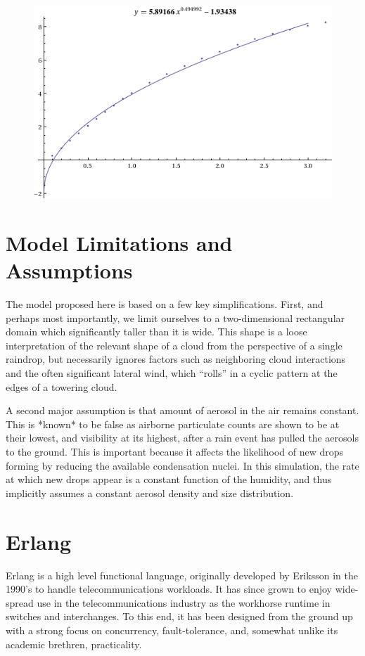 \documentclass[twocolumn,a4paper,10pt]{article}
\begin{document}
\begin{figure}[t]
    \centering
    \includegraphics[width=0.75\linewidth]{terminal_velocity}
    \caption{}
    \label{fig:velocity}
\end{figure}


\section{Model Limitations and Assumptions}

The model proposed here is based on a few key simplifications. First, and
perhaps most importantly, we limit ourselves to a two-dimensional rectangular
domain which significantly taller than it is wide. This shape is a loose
interpretation of the relevant shape of a cloud from the perspective of a single
raindrop, but necessarily ignores factors such as neighboring cloud
interactions and the often significant lateral wind, which ``rolls'' in a cyclic
pattern at the edges of a towering cloud.

A second major assumption is that amount of aerosol in the air remains constant.
This is *known* to be false as airborne particulate counts are shown to be at
their lowest, and visibility at its highest, after a rain event has pulled the
aerosols to the ground. This is important because it affects the likelihood of
new drops forming by reducing the available condensation nuclei. In this
simulation, the rate at which new drops appear is a constant function of the
humidity, and thus implicitly assumes a constant aerosol density and size
distribution.


\section{Erlang}

Erlang is a high level functional language, originally developed by Eriksson in
the 1990's to handle telecommunications workloads. It has since grown to enjoy
wide-spread use in the telecommunications industry as the workhorse runtime in
switches and interchanges. To this end, it has been designed from the ground up
with a strong focus on concurrency, fault-tolerance, and, somewhat unlike its
academic brethren, practicality.
\end{document}
